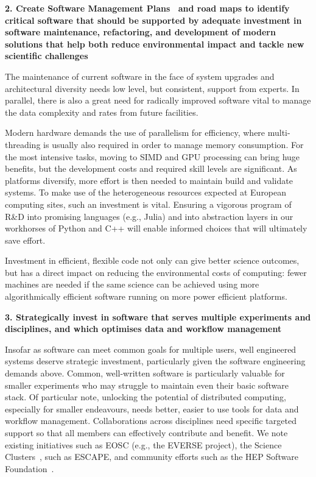 {\bf 2. Create Software Management Plans~\cite{SMPs} and road maps to identify critical software that should be supported by adequate investment in software maintenance, refactoring, and development of modern solutions that help both reduce environmental impact and tackle new scientific challenges}

The maintenance of current software in the face of system upgrades and architectural diversity needs low level, but consistent, support from experts. In parallel, there is also a great need for radically improved software vital to manage the data complexity and rates from future facilities.

Modern hardware demands the use of parallelism for efficiency, where multi-threading is usually also required in order to manage memory consumption. For the most intensive tasks, moving to SIMD and GPU processing can bring huge benefits, but the development costs and required skill levels are significant. As platforms diversify, more effort is then needed to maintain build and validate systems. To make use of the heterogeneous resources expected at European computing sites, such an investment is vital. Ensuring a vigorous program of R\&D into promising languages (e.g., Julia) and into abstraction layers in our workhorses of Python and C++ will enable informed choices that will ultimately save effort.

Investment in efficient, flexible code not only can give better science outcomes, but has a direct impact on reducing the environmental costs of computing: fewer machines are needed if the same science can be achieved using more algorithmically efficient software running on more power efficient platforms.

{\bf 3. Strategically invest in software that serves multiple experiments and disciplines, and which optimises data and workflow management}

Insofar as software can meet common goals for multiple users, well engineered systems deserve strategic investment, particularly given the software engineering demands above. Common, well-written software is particularly valuable for smaller experiments who may struggle to maintain even their basic software stack.
Of particular note, unlocking the potential of distributed computing, especially for smaller endeavours, needs better, easier to use tools for data and workflow management.
Collaborations across disciplines need specific targeted support so that all members can effectively contribute and benefit. We note existing initiatives such as EOSC (e.g., the EVERSE project), the Science Clusters~\cite{ScienceClusters}, such as ESCAPE, and community efforts such as the HEP Software Foundation~\cite{HSF}.

